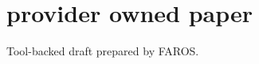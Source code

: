 \documentclass{article}
\begin{document}
\section*{provider owned paper}
Tool-backed draft prepared by FAROS.\n
\end{document}
